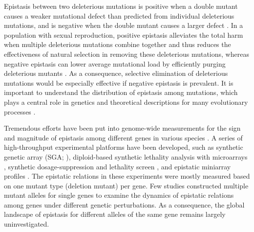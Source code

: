 Epistasis between two deleterious mutations is positive when a double
mutant causes a weaker mutational defect than predicted from
individual deleterious mutations, and is negative when the double
mutant causes a larger defect \citep{Phillips2008, Boone2007}. In a
population with sexual
reproduction, positive epistasis alleviates the total harm when
multiple deleterious mutations combine together and thus reduces the
effectiveness of natural selection in removing these deleterious
mutations, whereas negative epistasis can lower average mutational
load by efficiently purging deleterious mutants \citep{Kimura1966}. As
a consequence,
selective elimination of deleterious mutations would be especially
effective if negative epistasis is prevalent. It is important to
understand the distribution of epistasis among mutations, which plays
a central role in genetics and theoretical descriptions for many
evolutionary processes \citep{Phillips2008, Boone2007}.

Tremendous efforts have been put into genome-wide measurements for the
sign and magnitude of epistasis among different genes in various
species \citep{Costanzo2010, Tong2004, Pan2004, Pan2006,
ISI:000176466300018, Measday2005, Sopko2006, Collins2007,
Kornmann2009, Fiedler2009, Bonhoeffer2004, Roguev2008}.  A series of
high-throughput experimental platforms have been developed, such as
synthetic genetic array (SGA; \citealt{Costanzo2010, Tong2004}),
diploid-based synthetic lethality analysis with microarrays
\citep{Pan2004, Pan2006}, synthetic dosage-suppression and lethality
screen \citep{ISI:000176466300018, Measday2005, Sopko2006}, and
epistatic miniarray profiles \citep{Collins2007, Kornmann2009,
Fiedler2009}. The epistatic relations in these
experiments were mostly measured based on one mutant type (deletion
mutant) per gene. Few studies constructed multiple mutant alleles for
single genes to examine the dynamics of epistatic relations among
genes under different genetic perturbations. As a consequence, the
global landscape of epistasis for different alleles of the same gene
remains largely uninvestigated.

